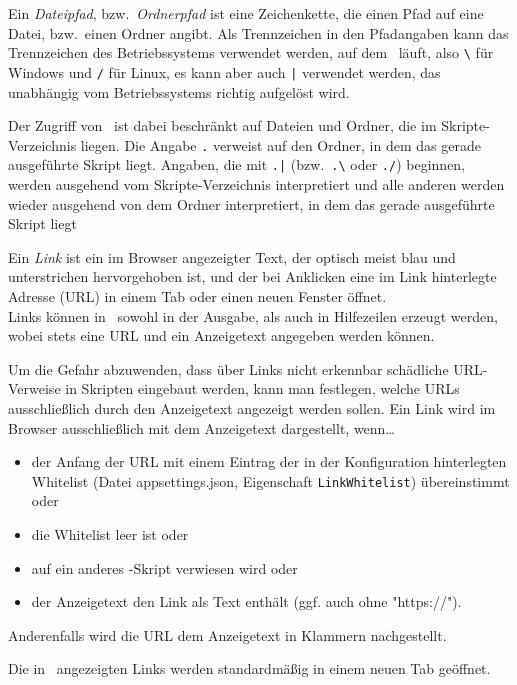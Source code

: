 \begin{basisformat}\label{defDateipfad}
Ein \emph{Dateipfad}, bzw.\  \emph{Ordnerpfad} ist eine Zeichenkette, die einen Pfad auf eine Datei, bzw.\ einen Ordner angibt. Als Trennzeichen in den Pfadangaben kann das Trennzeichen des Betriebssystems verwendet werden, auf dem \FPZ\ läuft, also \verb|\| für Windows und \verb|/| für Linux, es kann aber auch \verb=|= verwendet werden, das unabhängig vom Betriebssystems richtig aufgelöst wird.\par
Der Zugriff von \FPZ\ ist dabei beschränkt auf Dateien und Ordner, die im Skripte-Verzeichnis liegen. Die Angabe \verb|.| verweist auf den Ordner, in dem das gerade ausgeführte Skript liegt. Angaben, die mit \verb=.|= (bzw.\ \verb|.\| oder \verb|./|) beginnen, werden ausgehend vom Skripte-Verzeichnis interpretiert und alle anderen werden wieder ausgehend von dem Ordner interpretiert, in dem das gerade ausgeführte Skript liegt
\end{basisformat}

\begin{basisformat}\label{defLinks}
Ein \emph{Link} ist ein im Browser angezeigter Text, der optisch meist blau und unterstrichen hervorgehoben ist, und der bei Anklicken eine im Link hinterlegte Adresse (URL) in einem Tab oder einen neuen Fenster öffnet.\\
Links können in \FPZ\ sowohl in der Ausgabe, als auch in Hilfezeilen erzeugt werden, wobei stets eine URL und ein Anzeigetext angegeben werden können.\par
Um die Gefahr abzuwenden, dass über Links nicht erkennbar schädliche URL-Verweise in Skripten eingebaut werden, kann man festlegen, welche URLs ausschließlich durch den Anzeigetext angezeigt werden sollen. Ein Link wird im Browser ausschließlich mit dem Anzeigetext dargestellt, wenn\dots
\begin{itemize}
\item der Anfang der URL mit einem Eintrag der in der Konfiguration hinterlegten Whitelist (Datei appsettings.json, Eigenschaft \verb|LinkWhitelist|) übereinstimmt oder
\item die Whitelist leer ist oder
\item auf ein anderes \FPZb-Skript verwiesen wird oder
\item der Anzeigetext den Link als Text enthält (ggf. auch ohne "https://").
\end{itemize}
Anderenfalls wird die URL dem Anzeigetext in Klammern nachgestellt.\par
Die in \FPZ\ angezeigten Links werden standardmäßig in einem neuen Tab geöffnet.
\end{basisformat}

